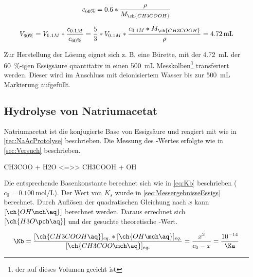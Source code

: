 \documentclass{article}
\begin{document}
         \begin{equation}
           c_{60\%} = 0.6 * \frac{\rho}{M_{\ch{CH3COOH}}}  \label{eq:Konzentration}
         \end{equation}
       
         \begin{equation}
           V_{60\%} = V_{0.1 M} * \frac{c_{0.1 M}}{c_{60\%}} = \frac{5}{3} * V_{0.1 M} * \frac{c_{0.1 M} * M_{\ch{CH3COOH}}}{\rho} = \SI[mode=text]{4.72}{\milli\liter} \label{eq:Volumen}
         \end{equation}
       
         Zur Herstellung der Lösung eignet sich z. B. eine Bürette, mit der \SI[mode=text]{4.72}{\milli\liter} der \SI[mode=text]{60}{\percent}-igen Essigsäure quantitativ in einen \SI[mode=text]{500}{\milli\liter} Messkolben\footnote{der auf dieses Volumen geeicht ist} transferiert werden. Dieser wird im Anschluss mit deionisiertem Wasser bis zur \SI[mode=text]{500}{\milli\liter} Markierung aufgefüllt.
          
    \pagebreak
    
    \subsection{Hydrolyse von Natriumacetat} \label{sec:HydrolyseNatrium}
     
       Natriumacetat ist die konjugierte Base von Essigsäure und reagiert mit  wie in \ref{rec:NaAcProtolyse} beschrieben. Die Messung des \pH-Wertes erfolgte wie in \ref{sec:Versuch} beschrieben.
       
       \begin{reaction}
         CH3COO\mch\aq{} + H2O <=>> CH3COOH\aq{} + OH\mch\aq \label{rec:NaAcProtolyse} \\
       \end{reaction} 
       
       Die entsprechende Basenkonstante \Kb berechnet sich wie in \eqref{eq:Kb} beschrieben ($c_{0} = \SI[mode=text]{0.100}{\mole\per\liter}$). Der Wert von $K_{s}$ wurde in \ref{sec:MessergebnisseEssigs} berechnet. Durch Auflösen der quadratischen Gleichung nach $x$ kann $[\ch{OH\mch\aq}]$ berechnet werden. Daraus errechnet sich $[\ch{H3O\pch\aq}]$ und der gesuchte theoretische \pH-Wert. 
       
       \begin{equation}
         \Kb = \frac{[\ch{CH3COOH\aq}]_{eq.} * [\ch{OH\mch\aq}]_{eq.}}{[\ch{CH3COO\mch\aq}]_{eq.}} = \frac{x^2}{c_{0}-x} = \frac{\num{e-14}}{\Ka} \label{eq:Kb}
       \end{equation}
       
\end{document}
